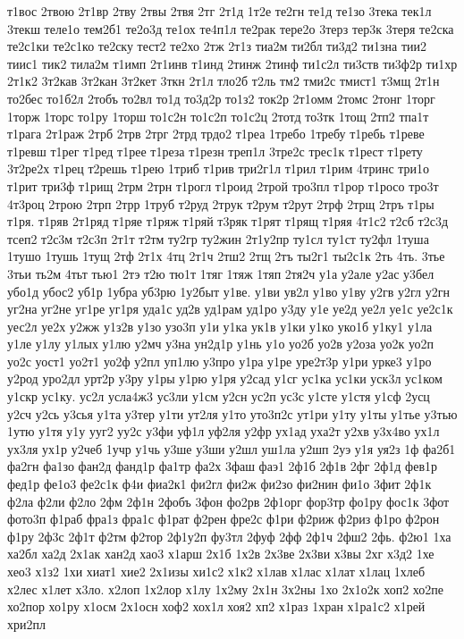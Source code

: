 {т1вос
2твою
2т1вр
2тву
2твы
2твя
2тг
2т1д
1т2е
те2гн
те1д
те1зо
3тека
тек1л
3текш
теле1о
тем2б1
те2о3д
те1ох
те4п1л
те2рак
тере2о
3терз
тер3к
3теря
те2ска
те2с1ки
те2с1ко
те2ску
тест2
те2хо
2тж
2т1з
тиа2м
ти2бл
ти3д2
ти1зна
тии2
тиис1
тик2
тила2м
т1имп
2т1инв
т1инд
2тинж
2тинф
ти1с2л
ти3ств
ти3ф2р
ти1хр
2т1к2
3т2кав
3т2кан
3т2кет
3ткн
2т1л
тло2б
т2ль
тм2
тми2с
тмист1
т3мщ
2т1н
то2бес
то1б2л
2тобъ
то2вл
то1д
то3д2р
то1з2
ток2р
2т1омм
2томс
2тонг
1торг
1торж
1торс
то1ру
1торш
то1с2н
то1с2п
то1с2ц
2тотд
то3тк
1тощ
2тп2
тпа1т
т1рага
2т1раж
2трб
2трв
2трг
2трд
трдо2
т1реа
1требо
1требу
т1ребь
т1реве
т1ревш
т1рег
т1ред
т1рее
т1реза
т1резн
треп1л
3тре2с
трес1к
т1рест
т1рету
3т2ре2х
т1рец
т2решь
т1рею
1триб
т1рив
три2г1л
т1рил
т1рим
4тринс
три1о
т1рит
три3ф
т1рищ
2трм
2трн
т1рогл
т1роид
2трой
тро3пл
т1рор
т1росо
тро3т
4т3роц
2трою
2трп
2трр
1труб
т2руд
2трук
т2рум
т2рут
2трф
2трщ
2тръ
т1ры
т1ря.
т1ряв
2т1ряд
т1ряе
т1ряж
т1ряй
т3ряк
т1рят
т1рящ
т1ряя
4т1с2
т2сб
т2с3д
тсеп2
т2с3м
т2с3п
2т1т
т2тм
ту2гр
ту2жин
2т1у2пр
ту1сл
ту1ст
ту2фл
1туша
1тушо
1тушь
1тущ
2тф
2т1х
4тц
2т1ч
2тш2
2тщ
2тъ
ты2г1
ты2с1к
2ть
4ть.
3тье
3тьи
ть2м
4тьт
тью1
2тэ
т2ю
тю1т
1тяг
1тяж
1тяп
2тя2ч
у1а
у2але
у2ас
у3бел
убо1д
убос2
уб1р
1убра
уб3рю
1у2быт
у1ве.
у1ви
ув2л
у1во
у1ву
у2гв
у2гл
у2гн
уг2на
уг2не
уг1ре
уг1ря
уда1с
уд2в
уд1рам
уд1ро
у3ду
у1е
уе2д
уе2л
уе1с
уе2с1к
уес2л
уе2х
у2жж
у1з2в
у1зо
узо3п
у1и
у1ка
ук1в
у1ки
у1ко
уко1б
у1ку1
у1ла
у1ле
у1лу
у1лых
у1лю
у2мч
у3на
ун2д1р
у1нь
у1о
уо2б
уо2в
у2оза
уо2к
уо2п
уо2с
уост1
уо2т1
уо2ф
у2пл
уп1лю
у3про
у1ра
у1ре
уре2т3р
у1ри
урке3
у1ро
у2род
уро2дл
урт2р
у3ру
у1ры
у1рю
у1ря
у2сад
у1сг
ус1ка
ус1ки
уск3л
ус1ком
у1скр
ус1ку.
ус2л
усла4ж3
ус3ли
у1см
у2сн
ус2п
ус3с
у1сте
у1стя
у1сф
2усц
у2сч
у2сь
у3сья
у1та
у3тер
у1ти
ут2ля
у1то
уто3п2с
ут1ри
у1ту
у1ты
у1тье
у3тью
1утю
у1тя
у1у
ууг2
уу2с
у3фи
уф1л
уф2ля
у2фр
ух1ад
уха2т
у2хв
у3х4во
ух1л
ух3ля
ух1р
у2чеб
1учр
у1чь
у3ше
у3ши
у2шл
уш1ла
у2шп
2уэ
у1я
уя2з
1ф
фа2б1
фа2гн
фа1зо
фан2д
фанд1р
фа1тр
фа2х
3фаш
фаэ1
2ф1б
2ф1в
2фг
2ф1д
фев1р
фед1р
фе1о3
фе2с1к
ф4и
фиа2к1
фи2гл
фи2ж
фи2зо
фи2нин
фи1о
3фит
2ф1к
ф2ла
ф2ли
ф2ло
2фм
2ф1н
2фобъ
3фон
фо2рв
2ф1орг
фор3тр
фо1ру
фос1к
3фот
фото3п
ф1раб
фра1з
фра1с
ф1рат
ф2рен
фре2с
ф1ри
ф2риж
ф2риз
ф1ро
ф2рон
ф1ру
2ф3с
2ф1т
ф2тм
ф2тор
2ф1у2п
фу3тл
2фуф
2фф
2ф1ч
2фш2
2фь.
ф2ю1
1ха
ха2бл
ха2д
2х1ак
хан2д
хао3
х1арш
2х1б
1х2в
2х3ве
2х3ви
х3вы
2хг
х3д2
1хе
хео3
х1з2
1хи
хиат1
хие2
2х1изы
хи1с2
х1к2
х1лав
х1лас
х1лат
х1лац
1хлеб
х2лес
х1лет
х3ло.
х2лоп
1х2лор
х1лу
1х2му
2х1н
3х2ны
1хо
2х1о2к
хоп2
хо2пе
хо2пор
хо1ру
х1осм
2х1осн
хоф2
хох1л
хоя2
хп2
х1раз
1хран
х1ра1с2
х1рей
хри2пл
}
